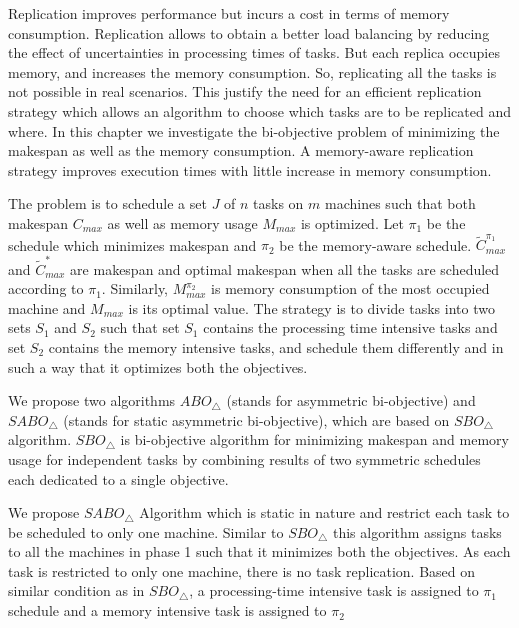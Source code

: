 \label{ch5}
\label{Intro}

 Replication improves performance but incurs a cost in terms of memory consumption.  
 Replication allows to obtain a better load balancing by reducing the effect of 
 uncertainties in processing times of tasks. But each replica occupies memory, and increases the memory consumption. 
 So, replicating all the tasks is not possible in real scenarios. This justify the need for an efficient replication 
 strategy which allows an algorithm to choose which tasks are to be replicated and where.
 In this chapter we investigate the bi-objective problem of minimizing the makespan as well as the memory consumption. A memory-aware replication strategy improves execution times with little increase in memory consumption. 

 The problem is to schedule a set $J$ of $n$ tasks on $m$ machines such that both makespan $C_{max}$ as well as memory usage $M_{max}$ is optimized.  
  Let $\pi_1$ be the schedule  which minimizes makespan and $\pi_2$ be the memory-aware schedule. $\tilde{C}^{\pi_1}_{max}$ and $\tilde{C}^{*}_{max}$ are makespan and optimal makespan when all the tasks are scheduled according to $\pi_1$. Similarly, $M^{\pi_2}_{max}$ is  memory consumption of the most  occupied machine and $M_{max}$ is its optimal value. The strategy is to divide tasks into two sets $S_1$ and $S_2$ such that set $S_1$ contains the processing time intensive tasks and set $S_2$ contains the memory intensive tasks, and schedule them differently and in such a way that it optimizes both the objectives. 
  
  We propose two algorithms $ABO_\triangle$ (stands for asymmetric bi-objective) and $SABO_\triangle$ (stands for static asymmetric bi-objective), which are based on $SBO_\triangle$ algorithm. $SBO_\triangle$ is bi-objective algorithm for minimizing makespan and memory usage for independent tasks by combining results of two symmetric schedules each dedicated to a single objective.
  
                  
                  We propose $SABO_\triangle$ Algorithm which is static in nature and restrict each task to be scheduled to only one machine. Similar to $SBO_\triangle$ this algorithm assigns tasks to all the machines in phase 1 such that it minimizes both the objectives. As each task is restricted to only one machine, there is no task replication. Based on similar condition as in $SBO_\triangle$, a processing-time intensive task is assigned to $\pi_1$ schedule and a memory intensive task is assigned to $\pi_2$
                  
